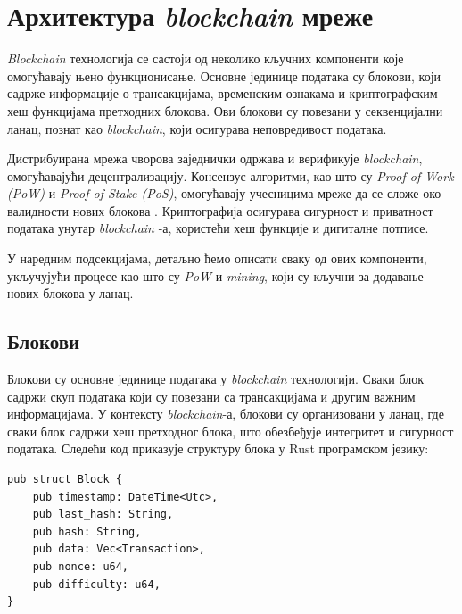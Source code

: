 \documentclass[12pt, a4paper]{article}
\begin{document}
\newpage
\section{Архитектура \textit{blockchain} мреже}
\textit{Blockchain} технологија се састоји од неколико кључних компоненти које омогућавају њено функционисање. Основне јединице података су блокови, који садрже информације о трансакцијама, временским ознакама и криптографским хеш функцијама претходних блокова. Ови блокови су повезани у секвенцијални ланац, познат као \textit{blockchain}, који осигурава неповредивост података. 

Дистрибуирана мрежа чворова заједнички одржава и верификује \textit{blockchain}, омогућавајући децентрализацију. Консензус алгоритми, као што су \textit{Proof of Work (PoW)} и \textit{Proof of Stake (PoS)}, омогућавају учесницима мреже да се сложе око валидности нових блокова \cite{10}. Криптографија осигурава сигурност и приватност података унутар \textit{blockchain} -а, користећи хеш функције и дигиталне потписе. 

У наредним подсекцијама, детаљно ћемо описати сваку од ових компоненти, укључујући процесе као што су \textit{PoW} и \textit{mining}, који су кључни за додавање нових блокова у ланац.


\subsection{Блокови}
Блокови су основне јединице података у \textit{blockchain} технологији. Сваки блок садржи скуп података који су повезани са трансакцијама и другим важним информацијама. У контексту \textit{blockchain}-а, блокови су организовани у ланац, где сваки блок садржи хеш претходног блока, што обезбеђује интегритет и сигурност података. Следећи код приказује структуру блока у Rust програмском језику:

\begin{verbatim}
pub struct Block {
    pub timestamp: DateTime<Utc>,
    pub last_hash: String,
    pub hash: String,
    pub data: Vec<Transaction>,
    pub nonce: u64,
    pub difficulty: u64,
}
\end{verbatim}
\end{document}
